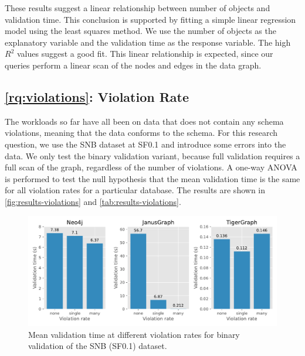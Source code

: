 \documentclass{report}
\theoremstyle{definition}
\begin{document}
These results suggest a linear relationship between number of objects and validation time. This conclusion is supported by fitting a simple linear regression model using the least squares method. We use the number of objects as the explanatory variable and the validation time as the response variable. The high $R^2$ values suggest a good fit. This linear relationship is expected, since our queries perform a linear scan of the nodes and edges in the data graph.

\subsection{\ref*{rq:violations}: Violation Rate}

The workloads so far have all been on data that does not contain any schema violations, meaning that the data conforms to the schema. For this research question, we use the SNB dataset at SF0.1 and introduce some errors into the data. We only test the binary validation variant, because full validation requires a full scan of the graph, regardless of the number of violations. A one-way ANOVA is performed to test the null hypothesis that the mean validation time is the same for all violation rates for a particular database. The results are shown in \autoref{fig:results-violations} and \autoref{tab:results-violations}.

\begin{figure}[t]
  \centering
  \includegraphics[scale=0.5]{figures/results-violations.pdf}
  \caption[Mean validation time at different violation rates]{Mean validation time at different violation rates for binary validation of the SNB (SF0.1) dataset.}
  \label{fig:results-violations}
\end{figure}
\end{document}
